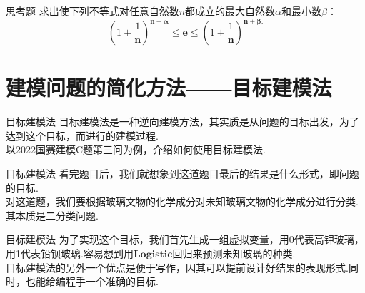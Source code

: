 \documentclass{beamer}
\begin{document}
\begin{frame}{思考题}
		求出使下列不等式对任意自然数$n$都成立的最大自然数$\alpha$和最小数$\beta \text{：}$
		$$
		\left( 1+\frac{1}{\boldsymbol{n}} \right) ^{\boldsymbol{n}+\boldsymbol{\alpha }}\le \boldsymbol{e}\le \left( 1+\frac{1}{\boldsymbol{n}} \right) ^{\boldsymbol{n}+\boldsymbol{\beta }.}
		$$
\end{frame}
\section{建模问题的简化方法——目标建模法}
\begin{frame}{目标建模法}
目标建模法是一种逆向建模方法，其实质是从问题的目标出发，为了达到这个目标，而进行的建模过程.\\
以2022国赛建模C题第三问为例，介绍如何使用目标建模法.
\end{frame}
\begin{frame}{目标建模法}
看完题目后，我们就想象到这道题目最后的结果是什么形式，即问题的目标.\\
对这道题，我们要根据玻璃文物的化学成分对未知玻璃文物的化学成分进行分类.其本质是二分类问题.

\end{frame}
\begin{frame}{目标建模法}
为了实现这个目标，我们首先生成一组虚拟变量，用0代表高钾玻璃，用1代表铅钡玻璃.容易想到用$\boldsymbol{Logistic}$回归来预测未知玻璃的种类.\\
目标建模法的另外一个优点是便于写作，因其可以提前设计好结果的表现形式.同时，也能给编程手一个准确的目标.
\end{frame}
\end{document}
